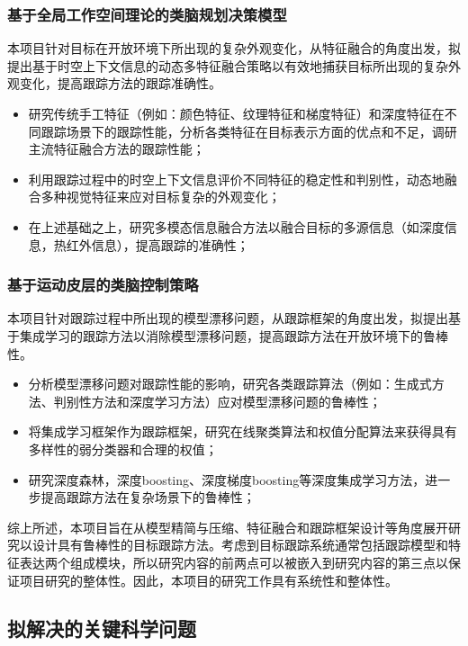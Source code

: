 \documentclass[a4paper,zihao=-4]{article}
\begin{document}
\subsubsection{基于全局工作空间理论的类脑规划决策模型}
本项目针对目标在开放环境下所出现的复杂外观变化，从特征融合的角度出发，拟提出基于时空上下文信息的动态多特征融合策略以有效地捕获目标所出现的复杂外观变化，提高跟踪方法的跟踪准确性。

\begin{itemize}
	\item 研究传统手工特征（例如：颜色特征、纹理特征和梯度特征）和深度特征在不同跟踪场景下的跟踪性能，分析各类特征在目标表示方面的优点和不足，调研主流特征融合方法的跟踪性能；
	\item 利用跟踪过程中的时空上下文信息评价不同特征的稳定性和判别性，动态地融合多种视觉特征来应对目标复杂的外观变化；
	\item 在上述基础之上，研究多模态信息融合方法以融合目标的多源信息（如深度信息，热红外信息），提高跟踪的准确性；
\end{itemize}


\subsubsection{基于运动皮层的类脑控制策略}
本项目针对跟踪过程中所出现的模型漂移问题，从跟踪框架的角度出发，拟提出基于集成学习的跟踪方法以消除模型漂移问题，提高跟踪方法在开放环境下的鲁棒性。

\begin{itemize}
	\item 分析模型漂移问题对跟踪性能的影响，研究各类跟踪算法（例如：生成式方法、判别性方法和深度学习方法）应对模型漂移问题的鲁棒性；
	\item 将集成学习框架作为跟踪框架，研究在线聚类算法和权值分配算法来获得具有多样性的弱分类器和合理的权值；
	\item 研究深度森林，深度boosting、深度梯度boosting等深度集成学习方法，进一步提高跟踪方法在复杂场景下的鲁棒性；
\end{itemize}

综上所述，本项目旨在从模型精简与压缩、特征融合和跟踪框架设计等角度展开研究以设计具有鲁棒性的目标跟踪方法。考虑到目标跟踪系统通常包括跟踪模型和特征表达两个组成模块，所以研究内容的前两点可以被嵌入到研究内容的第三点以保证项目研究的整体性。因此，本项目的研究工作具有系统性和整体性。


\subsection{拟解决的关键科学问题}
\end{document}

